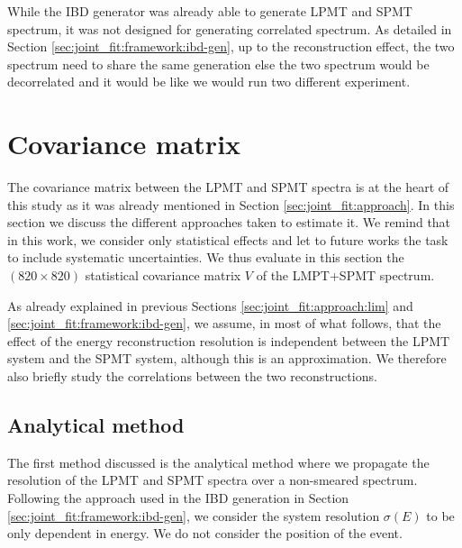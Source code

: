 \documentclass[../main.tex]{subfiles}
\begin{document}
While the IBD generator was already able to generate LPMT and SPMT spectrum, it was not designed for generating correlated spectrum. As detailed in Section \ref{sec:joint_fit:framework:ibd-gen}, up to the reconstruction effect, the two spectrum need to share the same generation else the two spectrum would be decorrelated and it would be like we would run two different experiment.
%
%
%



\section{Covariance matrix}
\label{sec:joint_fit:cov_mat}

The covariance matrix between the LPMT and SPMT spectra is at the heart of this study as it was already mentioned in Section \ref{sec:joint_fit:approach}. In this section we discuss the different approaches taken to estimate it.
We remind that in this work, we consider only statistical effects and let to future works the task to include systematic uncertainties. We thus evaluate in this section the $(820\times820)$ statistical covariance matrix $V$ of the LMPT+SPMT spectrum.

As already explained in previous Sections \ref{sec:joint_fit:approach:lim} and \ref{sec:joint_fit:framework:ibd-gen}, we assume, in most of what follows, that the effect of the energy reconstruction resolution is independent between the LPMT system and the SPMT system, although this is an approximation. We therefore also briefly study the correlations between the two reconstructions.

\subsection{Analytical method}

The first method discussed is the analytical method where we propagate the resolution of the LPMT and SPMT spectra over a non-smeared spectrum. Following the approach used in the IBD generation in Section \ref{sec:joint_fit:framework:ibd-gen}, we consider the system resolution $\sigma(E)$ to be only dependent in energy. We do not consider the position of the event.
\end{document}
